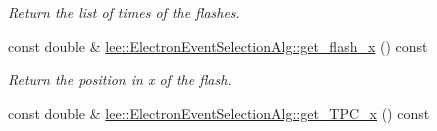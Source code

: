 \begin{DoxyCompactItemize}
\begin{DoxyCompactList}\small\item\em Return the list of times of the flashes. \end{DoxyCompactList}\item 
\hypertarget{group__lee_ga69b697a2eec43de221621bd4aca906e2}{const double \& \hyperlink{group__lee_ga69b697a2eec43de221621bd4aca906e2}{lee\-::\-Electron\-Event\-Selection\-Alg\-::get\-\_\-flash\-\_\-x} () const }\label{group__lee_ga69b697a2eec43de221621bd4aca906e2}

\begin{DoxyCompactList}\small\item\em Return the position in x of the flash. \end{DoxyCompactList}\item 
\hypertarget{group__lee_ga2c653a5d3225c3e3aa5dc84738ffa086}{const double \& \hyperlink{group__lee_ga2c653a5d3225c3e3aa5dc84738ffa086}{lee\-::\-Electron\-Event\-Selection\-Alg\-::get\-\_\-\-T\-P\-C\-\_\-x} () const }\label{group__lee_ga2c653a5d3225c3e3aa5dc84738ffa086}


\end{DoxyCompactItemize}
